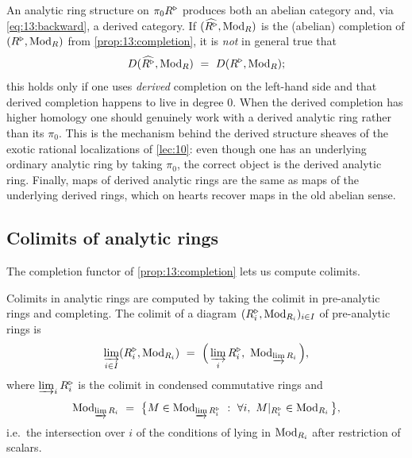 \begin{remark}
\label{rmk:13:derived-cat-warning}
An analytic ring structure on $\pi_0R^{\triangleright}$ produces both an abelian category and,
via \eqref{eq:13:backward}, a derived category. If
$(\widehat{R^{\triangleright}},\operatorname{Mod}_R)$ is the (abelian) completion of $(R^{\triangleright},\operatorname{Mod}_R)$ from
\cref{prop:13:completion}, it is \emph{not} in general true that
\begin{equation*}
D(\widehat{R^{\triangleright}},\operatorname{Mod}_R)\ =\ D(R^{\triangleright},\operatorname{Mod}_R);
\end{equation*}
this holds only if one uses \emph{derived} completion on the left-hand side and
that derived completion happens to live in degree $0$. When the derived
completion has higher homology one should genuinely work with a derived analytic
ring rather than its $\pi_0$. This is the mechanism behind the derived structure
sheaves of the exotic rational localizations of \cref{lec:10}: even though one has
an underlying ordinary analytic ring by taking $\pi_0$, the correct object is the
derived analytic ring. Finally, maps of derived analytic rings are the same as
maps of the underlying derived rings, which on hearts recover maps in the old
abelian sense.
\end{remark}

\subsection{Colimits of analytic rings}

The completion functor of \cref{prop:13:completion} lets us compute colimits.

\begin{proposition}
\label{prop:13:colimits}
Colimits in analytic rings are computed by taking the colimit in pre-analytic
rings and completing. The colimit of a diagram $(R^{\triangleright}_i,\operatorname{Mod}_{R_i})_{i\in I}$ of
pre-analytic rings is
\begin{equation}
\label{eq:13:colimit-formula}
\varinjlim_{i\in I}(\ur R_i,\Mod_{R_i})\ =\ \Big(\varinjlim_i \ur R_i,\ \Mod_{\varinjlim R_i}\Big),
\end{equation}
where $\varinjlim_iR^{\triangleright}_i$ is the colimit in condensed commutative rings and
\begin{equation}
\label{eq:13:colimit-modules}
\Mod_{\varinjlim R_i}\ =\ \big\{M\in\Mod_{\varinjlim \ur R_i}\ :\ \forall i,\ M|_{\ur R_i}\in\Mod_{R_i}\big\},
\end{equation}
i.e.\ the intersection over $i$ of the conditions of lying in $\operatorname{Mod}_{R_i}$ after
restriction of scalars.
\end{proposition}

